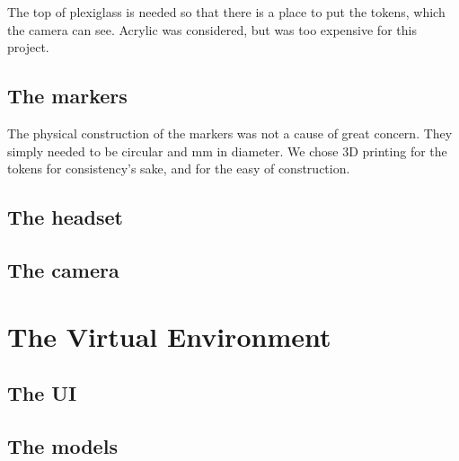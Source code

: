 The top of plexiglass is needed so that there is a place to put the tokens, which the camera can see. Acrylic was considered, but was too expensive for this project. 


\subsection{The markers}

The physical construction of the markers was not a cause of great concern. They simply needed to be circular and  mm in diameter. We chose 3D printing for the tokens for consistency's sake, and for the easy of construction.

\subsection{The headset}
\subsection{The camera}

\section{The Virtual Environment}

\subsection{The UI}
\subsection{The models}
